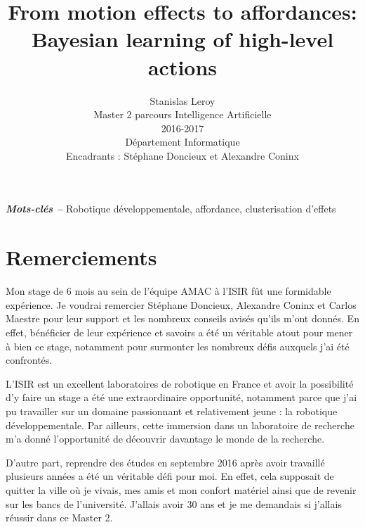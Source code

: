\documentclass{llncs}
\providecommand{\keywords}[1]{\textbf{\textit{Mots-clés --}} #1}
\begin{document}
\title{From motion effects to affordances: Bayesian learning of high-level actions}

\author{Stanislas Leroy\\
   Master 2 parcours Intelligence Artificielle\\
   2016-2017\\
   Département Informatique\\
   Encadrants : Stéphane Doncieux et Alexandre Coninx}

\maketitle

\keywords{Robotique développementale, affordance, clusterisation d'effets}






\section*{Remerciements}

Mon stage de 6 mois au sein de l'équipe AMAC à l'ISIR fût une formidable expérience. Je voudrai remercier Stéphane Doncieux, Alexandre Coninx et Carlos Maestre pour leur support et les nombreux conseils avisés qu'ils m'ont donnés. En effet, bénéficier de leur expérience et savoirs a été un véritable atout pour mener à bien ce stage, notamment pour surmonter les nombreux défis auxquels j'ai été confrontés.

L'ISIR est un excellent laboratoires de robotique en France et avoir la possibilité d'y faire un stage a été une extraordinaire opportunité, notamment parce que j'ai pu travailler sur un domaine passionnant et relativement jeune : la robotique développementale. Par ailleurs, cette immersion dans un laboratoire de recherche m'a donné l'opportunité de découvrir davantage le monde de la recherche.

D'autre part, reprendre des études en septembre 2016 après avoir travaillé plusieurs années a été un véritable défi pour moi. En effet, cela supposait de quitter la ville où je vivais, mes amis et mon confort matériel ainsi que de revenir sur les bancs de l'université. J'allais avoir 30 ans et je me demandais si j'allais réussir dans ce Master 2.
\end{document}
